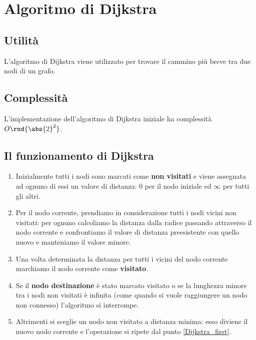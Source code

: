 \documentclass[\main/main.tex]{subfiles}
\begin{document}
\chapter{Algoritmo di Dijkstra}
\section{Utilità}
L'algoritmo di Dijkstra viene utilizzato per trovare il cammino più breve tra due nodi di un grafo.
\section{Complessità}
\begin{complexity}
  L'implementazione dell'algoritmo di Dijkstra iniziale ha complessità \(O\rnd{\abs{2}^2}\).
\end{complexity}

\section{Il funzionamento di Dijkstra}
\begin{enumerate}
  \item Inizialmente tutti i nodi sono marcati come \textbf{non visitati} e viene assegnata ad ognuno di essi un valore di distanza: \(0\) per il nodo iniziale ed \(\infty \) per tutti gli altri.
  \item Per il nodo corrente, prendiamo in considerazione tutti i nodi vicini non visitati: per ognuno calcoliamo la distanza dalla radice passando attraverso il nodo corrente e confrontiamo il valore di distanza preesistente con quello nuovo e manteniamo il valore minore.\label{Dijkstra_first}
  \item Una volta determinata la distanza per tutti i vicini del nodo corrente marchiamo il nodo corrente come \textbf{visitato}.
  \item Se il \textbf{nodo destinazione} è stato marcato visitato o se la lunghezza minore tra i nodi non visitati è infinita (come quando si vuole raggiungere un nodo non connesso) l'algoritmo si interrompe.
  \item Altrimenti si sceglie un nodo non visitato a distanza minima: esso diviene il nuovo nodo corrente e l'operazione si ripete dal punto \ref{Dijkstra_first}.
\end{enumerate}
\clearpage
\end{document}
